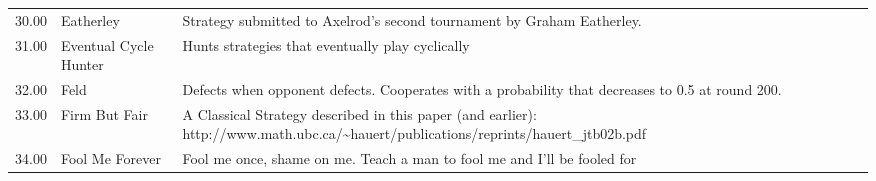 \begin{table}[!hbtp]
\begin{adjustbox}{width=2\textwidth, angle=90}
\begin{tabular}{rll}
	30.00  & Eatherley                   & Strategy submitted to Axelrod's second tournament by Graham Eatherley.                                                            \\
	31.00  & Eventual Cycle Hunter       & Hunts strategies that eventually play cyclically                                                                                  \\
	32.00  & Feld                        & Defects when opponent defects. Cooperates with a probability that decreases
	to 0.5 at round 200.                                                                                                                                                                                                                                                                                                                                                                                                                                                                                                                                                                                                                                                                                                                                                                                                                                                                                                                     \\
	33.00  & Firm But Fair               & A Classical Strategy described in this paper (and earlier):
	http://www.math.ubc.ca/\textasciitilde{}hauert/publications/reprints/hauert\_jtb02b.pdf                                                                                                                                                                                                                                                                                                                                                                                                                                                                                                                                                                                                                                                                                                                                                                                                                                                                                   \\
	34.00  & Fool Me Forever             & Fool me once, shame on me. Teach a man to fool me and I'll be fooled for

\end{tabular}
\end{adjustbox}
\end{table}

